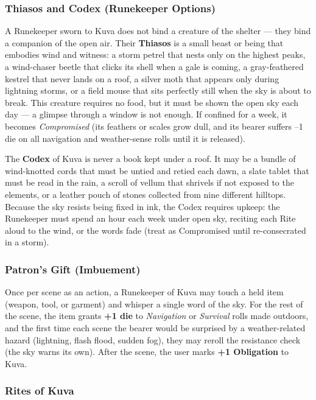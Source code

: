 \subsubsection*{Thiasos and Codex (Runekeeper Options)}

A Runekeeper sworn to Kuva does not bind a creature of the shelter --- they bind a companion of the open air. Their \textbf{Thiasos} is a small beast or being that embodies wind and witness: a storm petrel that nests only on the highest peaks, a wind-chaser beetle that clicks its shell when a gale is coming, a gray-feathered kestrel that never lands on a roof, a silver moth that appears only during lightning storms, or a field mouse that sits perfectly still when the sky is about to break. This creature requires no food, but it must be shown the open sky each day --- a glimpse through a window is not enough. If confined for a week, it becomes \textit{Compromised} (its feathers or scales grow dull, and its bearer suffers --1 die on all navigation and weather-sense rolls until it is released).

The \textbf{Codex} of Kuva is never a book kept under a roof. It may be a bundle of wind-knotted cords that must be untied and retied each dawn, a slate tablet that must be read in the rain, a scroll of vellum that shrivels if not exposed to the elements, or a leather pouch of stones collected from nine different hilltops. Because the sky resists being fixed in ink, the Codex requires upkeep: the Runekeeper must spend an hour each week under open sky, reciting each Rite aloud to the wind, or the words fade (treat as Compromised until re-consecrated in a storm).

\subsubsection*{Patron's Gift (Imbuement)}

Once per scene as an action, a Runekeeper of Kuva may touch a held item (weapon, tool, or garment) and whisper a single word of the sky. For the rest of the scene, the item grants \textbf{+1 die} to \textit{Navigation} or \textit{Survival} rolls made outdoors, and the first time each scene the bearer would be surprised by a weather-related hazard (lightning, flash flood, sudden fog), they may reroll the resistance check (the sky warns its own). After the scene, the user marks \textbf{+1 Obligation} to Kuva.

\subsubsection*{Rites of Kuva}

